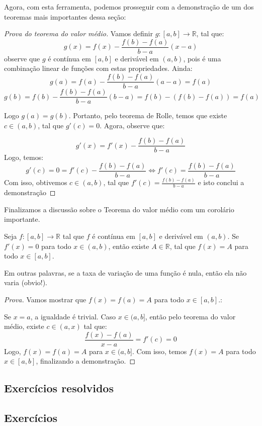 	Agora, com esta ferramenta, podemos prosseguir com a demonstração de um dos teoremas mais importantes dessa seção:
	
	\begin{proof}[Prova do teorema do valor médio]
		Vamos definir $g:[a,b]\to\mathbb{R}$, tal que:
		$$g(x) = f(x) - \frac{f(b) - f(a)}{b-a}(x-a)$$
		observe que $g$ é contínua em $[a,b]$ e derivável em $(a,b)$, pois é uma combinação linear de funções com estas propriedades. Ainda:
		$$g(a)= f(a) - \frac{f(b) - f(a)}{b-a}(a-a) = f(a)$$
		$$g(b)= f(b) - \frac{f(b) - f(a)}{b-a}(b-a) = f(b) - (f(b)-f(a)) = f(a)$$
		
		Logo $g(a)=g(b)$. Portanto, pelo teorema de Rolle, temos que existe $c\in(a,b)$, tal que $g'(c)=0$. Agora, observe que:
		
		$$g'(x) = f'(x) - \frac{f(b) - f(a)}{b-a}$$
		Logo, temos:
		$$g'(c)= 0 = f'(c) - \frac{f(b) - f(a)}{b-a} \iff f'(c) = \frac{f(b) - f(a)}{b-a}$$
		Com isso, obtivemos $c\in (a,b)$, tal que $f'(c) = \frac{f(b) - f(a)}{b-a}$ e isto conclui a demonstração
	\end{proof}
	
	Finalizamos a discussão sobre o Teorema do valor médio com um corolário importante.
	\begin{cor}
		Seja $f:[a,b]\to \mathbb{R}$ tal que $f$ é contínua em $[a,b]$ e derivável em $(a,b)$. Se $f'(x)=0$ para todo $x\in(a,b)$, então existe $A\in\mathbb{R}$, tal que $f(x)=A$ para todo $x\in[a,b]$. 
	\end{cor}
	Em outras palavras, se a taxa de variação de uma função é nula, então ela não varia (obvio!).
	
	\begin{proof}[Prova]
		Vamos mostrar que $f(x) = f(a) = A$ para todo $x\in[a,b]$.:
		
		 Se $x=a$, a igualdade é trivial. Caso $x\in(a,b]$, então pelo teorema do valor médio, existe $c\in(a,x)$ tal que:
		 $$\frac{f(x) - f(a)}{x-a} = f'(c) = 0$$
		 Logo, $f(x) = f(a) = A$ para $x\in(a,b]$. Com isso, temos $f(x)= A$ para todo $x\in[a,b]$, finalizando a demonstração.
		
	\end{proof}

\subsection*{Exercícios resolvidos}

\construirExeresol


\subsection*{Exercícios}

